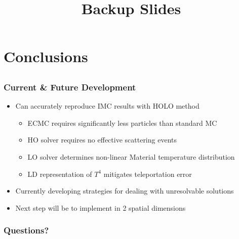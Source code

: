\documentclass[xcolor=dvipsnames,hyperref={pdfpagelabels=false},unknownkeysallowed]{beamer}
\newcommand{\coly}[1]{{\color{yellow} #1}}
\newcommand{\colb}[1]{{\color{blue} #1}}
\newlength{\wideitemsep}
\let\olditem\item
\renewcommand{\item}{\setlength{\itemsep}{\wideitemsep}\olditem}
\begin{document}
\section{Conclusions}
\subsection{}

\begin{frame}
    \frametitle{Current \& Future Development}
    \begin{itemize}
        \item Can accurately reproduce IMC results with HOLO method
        \begin{itemize}
            \item ECMC requires \colb{significantly less particles} than standard MC
            \item HO solver requires no effective scattering events
            \item LO solver determines non-linear Material temperature distribution
            \item LD representation of $T^4$ mitigates teleportation error
        \end{itemize}
        \pause
    \item Currently developing strategies for dealing with unresolvable solutions
    \item Next step will be to implement in 2 spatial dimensions
    \end{itemize}
\end{frame}

\date{}
\begin{frame}
    \frametitle{{\LARGE\coly{Questions?}}}
    \vspace{-0.21in}
    \titlepage \vspace{-0.2113in}
\end{frame}

\appendix
{}
\setcounter{finalframe}{\value{framenumber}}

\title{Backup Slides}
\author{}
\date{}
\end{document}
